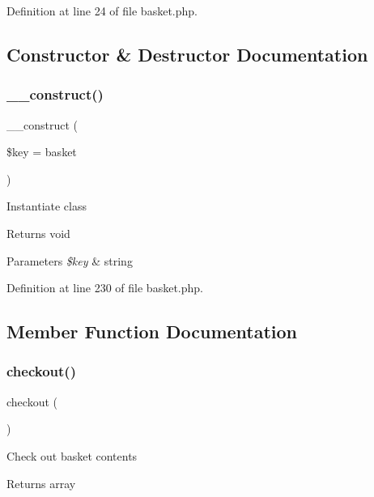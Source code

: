 Definition at line 24 of file basket.\+php.



\subsection{Constructor \& Destructor Documentation}
\hypertarget{class_basket_ae34d667a85d03b5da0154d74ae414768}{}\label{class_basket_ae34d667a85d03b5da0154d74ae414768} 
\subsubsection{\texorpdfstring{\+\_\+\+\_\+construct()}{\_\_construct()}}
{\footnotesize\ttfamily \+\_\+\+\_\+construct (\begin{DoxyParamCaption}\item[{}]{\$key = {\ttfamily \textquotesingle{}basket\textquotesingle{}} }\end{DoxyParamCaption})}

Instantiate class \begin{DoxyReturn}{Returns}
void 
\end{DoxyReturn}

\begin{DoxyParams}{Parameters}
{\em \$key} & string \\
\hline
\end{DoxyParams}


Definition at line 230 of file basket.\+php.



\subsection{Member Function Documentation}
\hypertarget{class_basket_ac41b8e359a8eb81494e030062e7b4bad}{}\label{class_basket_ac41b8e359a8eb81494e030062e7b4bad} 
\subsubsection{\texorpdfstring{checkout()}{checkout()}}
{\footnotesize\ttfamily checkout (\begin{DoxyParamCaption}{ }\end{DoxyParamCaption})}

Check out basket contents \begin{DoxyReturn}{Returns}
array 
\end{DoxyReturn}


